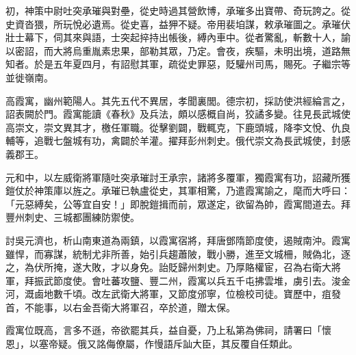 \begin{pinyinscope}
 初，神策中尉吐突承璀與對壘，從史時過其營飲博，承璀多出寶帶、奇玩誇之。從史資沓猥，所玩悅必遺焉。從史喜，益狎不疑。帝用裴垍謀，敕承璀圖之。承璀伏壯士幕下，伺其來與語，士突起捽持出帳後，縛內車中。從者驚亂，斬數十人，諭以密詔，而大將烏重胤素忠果，部勒其眾，乃定。會夜，疾驅，未明出境，道路無知者。於是五年夏四月，有詔慰其軍，疏從史罪惡，貶驩州司馬，賜死。子繼宗等並徙嶺南。



 高霞寓，幽州範陽人。其先五代不異居，孝聞裏閭。德宗初，採訪使洪經綸言之，詔表闕於門。霞寓能讀《春秋》及兵法，頗以感概自尚，狡譎多變。往見長武城使高崇文，崇文異其才，檄任軍職。從擊劉闢，戰輒克，下鹿頭城，降李文悅、仇良輔等，追戰七盤城有功，禽闢於羊灌。擢拜彭州刺史。俄代崇文為長武城使，封感義郡王。



 元和中，以左威衛將軍隨吐突承璀討王承宗，諸將多覆軍，獨霞寓有功，詔藏所獲鎧仗於神策庫以旌之。承璀已執盧從史，其軍相驚，乃遣霞寓諭之，麾而大呼曰：「元惡縛矣，公等宜自安！」即脫鎧揖而前，眾遂定，欲留為帥，霞寓間道去。拜豐州刺史、三城都團練防禦使。



 討吳元濟也，析山南東道為兩鎮，以霞寓宿將，拜唐鄧隋節度使，遏賊南沖。霞寓雖悍，而寡謀，統制尤非所善，始引兵趨蕭陂，戰小勝，進至文城柵，賊偽北，逐之，為伏所掩，遂大敗，才以身免。詒貶歸州刺史。乃厚賂權宦，召為右衛大將軍，拜振武節度使。會吐蕃攻鹽、豐二州，霞寓以兵五千屯拂雲堆，虜引去。浚金河，溉鹵地數千頃。改左武衛大將軍，又節度邠寧，位檢校司徒。寶歷中，疽發首，不能事，以右金吾衛大將軍召，卒於道，贈太保。



 霞寓位既高，言多不遜，帝欲罷其兵，益自憂，乃上私第為佛祠，請署曰「懷恩」，以塞帝疑。俄又詺侮僚屬，作慢語斥訕大臣，其反覆自任類此。



\end{pinyinscope}